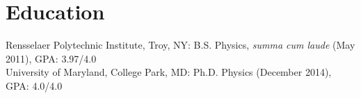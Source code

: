 \section{Education}
Rensselaer Polytechnic Institute, Troy, NY: B.S. Physics, \emph{summa cum laude} (May 2011), GPA: 3.97/4.0\\
University of Maryland, College Park, MD: Ph.D. Physics (December 2014), GPA: 4.0/4.0
